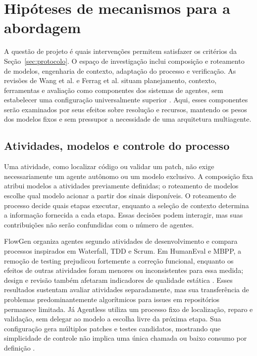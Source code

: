 \section{Hipóteses de mecanismos para a abordagem}

A questão de projeto é quais intervenções permitem satisfazer os critérios da Seção~\ref{sec:protocolo}. O espaço de investigação inclui composição e roteamento de modelos, engenharia de contexto, adaptação do processo e verificação. As revisões de Wang et al. e Ferrag et al. situam planejamento, contexto, ferramentas e avaliação como componentes dos sistemas de agentes, sem estabelecer uma configuração universalmente superior \cite{Wang2025AgenticProgramming,Ferrag2026AutonomousAgents}. Aqui, esses componentes serão examinados por seus efeitos sobre resolução e recursos, mantendo os pesos dos modelos fixos e sem pressupor a necessidade de uma arquitetura multiagente.

\subsection{Atividades, modelos e controle do processo}

Uma atividade, como localizar código ou validar um patch, não exige necessariamente um agente autônomo ou um modelo exclusivo. A composição fixa atribui modelos a atividades previamente definidas; o roteamento de modelos escolhe qual modelo acionar a partir dos sinais disponíveis. O roteamento de processo decide quais etapas executar, enquanto a seleção de contexto determina a informação fornecida a cada etapa. Essas decisões podem interagir, mas suas contribuições não serão confundidas com o número de agentes.

FlowGen organiza agentes segundo atividades de desenvolvimento e compara processos inspirados em Waterfall, TDD e Scrum. Em HumanEval e MBPP, a remoção de testing prejudicou fortemente a correção funcional, enquanto os efeitos de outras atividades foram menores ou inconsistentes para essa medida; design e revisão também afetaram indicadores de qualidade estática \cite{Lin2024FlowGen}. Esses resultados sustentam avaliar atividades separadamente, mas sua transferência de problemas predominantemente algorítmicos para issues em repositórios permanece limitada. Já Agentless utiliza um processo fixo de localização, reparo e validação, sem delegar ao modelo a escolha livre da próxima etapa. Sua configuração gera múltiplos patches e testes candidatos, mostrando que simplicidade de controle não implica uma única chamada ou baixo consumo por definição \cite{Xia2024Agentless}.

